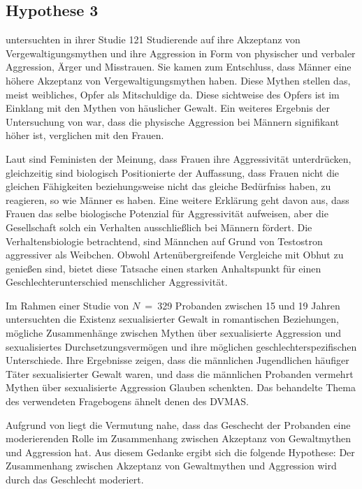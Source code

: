 \subsection{Hypothese 3}    \label{subsec_2.2.3}
\textcite{H2_u_3_Bhogal_2016} untersuchten in ihrer Studie 121 Studierende auf ihre Akzeptanz von Vergewaltigungsmythen und ihre Aggression in Form von physischer und verbaler Aggression, Ärger und Misstrauen. Sie kamen zum Entschluss, dass Männer eine höhere Akzeptanz von Vergewaltigungsmythen haben. Diese Mythen stellen das, meist weibliches, Opfer als Mitschuldige da. Diese sichtweise des Opfers ist im Einklang mit den Mythen von häuslicher Gewalt. Ein weiteres Ergebnis der Untersuchung von \textcite{H2_u_3_Bhogal_2016} war, dass die physische Aggression bei Männern signifikant höher ist, verglichen mit den Frauen.

Laut \textcite{H3_MFUnterschied} sind Feministen der Meinung, dass Frauen ihre Aggressivität unterdrücken, gleichzeitig sind biologisch Positionierte der Auffassung, dass Frauen nicht die gleichen Fähigkeiten beziehungsweise nicht das gleiche Bedürfniss haben, zu reagieren, so wie Männer es haben. Eine weitere Erklärung geht davon aus, dass Frauen das selbe biologische Potenzial für Aggressivität aufweisen, aber die Gesellschaft solch ein Verhalten ausschließlich bei Männern fördert. Die Verhaltensbiologie betrachtend, sind Männchen auf Grund von Testostron aggressiver als Weibchen. Obwohl Artenübergreifende Vergleiche mit Obhut zu genießen sind, bietet diese Tatsache einen starken Anhaltspunkt für einen Geschlechterunterschied menschlicher Aggressivität.

Im Rahmen einer Studie von $N$~=~329 Probanden zwischen 15 und 19 Jahren untersuchten \textcite{H3_2020} die Existenz sexualisierter Gewalt in romantischen Beziehungen, mögliche Zusammenhänge zwischen Mythen über sexualisierte Aggression und sexualisiertes Durchsetzungsvermögen und ihre möglichen geschlechterspezifischen Unterschiede. Ihre Ergebnisse zeigen, dass die männlichen Jugendlichen häufiger Täter sexualisierter Gewalt waren, und dass die männlichen Probanden vermehrt Mythen über sexualisierte Aggression Glauben schenkten. Das behandelte Thema des verwendeten Fragebogens ähnelt denen des DVMAS.

Aufgrund von \textcite{H2_u_3_Bhogal_2016, H3_MFUnterschied, H3_2020} liegt die Vermutung nahe, dass das Geschecht der Probanden eine moderierenden Rolle im Zusammenhang zwischen Akzeptanz von Gewaltmythen und Aggression hat. Aus diesem Gedanke ergibt sich die folgende Hypothese: Der Zusammenhang zwischen Akzeptanz von Gewaltmythen und Aggression wird durch das Geschlecht moderiert.

